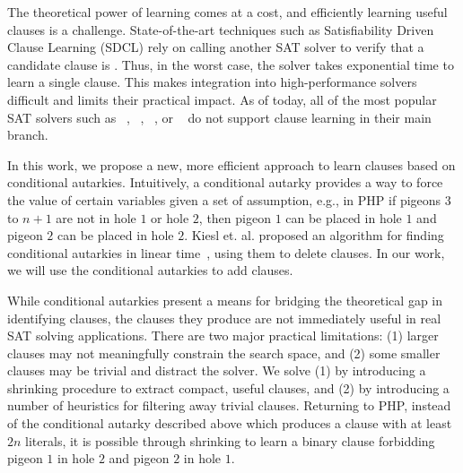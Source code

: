 The theoretical power of \pr learning comes at a cost, and efficiently learning
useful \pr clauses is a challenge. State-of-the-art techniques such as
Satisfiability Driven Clause Learning (SDCL) rely on calling another SAT solver
to verify that a candidate clause is \pr \cite{sadical}. 
Thus, in the worst case, the solver takes exponential time to learn a single \pr
clause. This makes integration into high-performance solvers difficult and
limits their practical impact. As of today, all of the most popular SAT solvers such as
\cadical~\cite{cadical}, \kissat~\cite{kissat},
\cryptoMiniSAT~\cite{cryptominisat}, or \lingeling~\cite{lingeling} do not
support \pr clause learning in their main branch.

In this work, we propose a new, more efficient approach to learn \pr clauses
based on conditional autarkies. Intuitively, a conditional autarky provides a
way to force the value of certain variables given a set of assumption, e.g., in
PHP if pigeons $3 $ to $ n+1$ are not in hole $1$ or hole $2$, then pigeon $1$
can be placed in hole $1$ and pigeon $2$ can be placed in hole $2$. Kiesl et.
al. proposed an algorithm for finding conditional autarkies in linear
time~\cite{conditionalautarkies}, using them to delete clauses. In our work, we
will use the conditional autarkies to add \pr clauses. 
%

While conditional autarkies present a means for bridging the theoretical gap in
identifying \pr clauses, the \pr clauses they produce are not immediately useful
in real SAT solving applications. There are two major practical limitations: (1)
larger \pr clauses may not meaningfully constrain the search space, and (2) some
smaller \pr clauses may be trivial and distract the solver. We solve (1) by
introducing a shrinking procedure to extract compact, useful \pr clauses, and
(2) by introducing a number of heuristics for filtering away trivial \pr clauses.
Returning to PHP, instead of the conditional autarky described above which
produces a clause with at least $2n$ literals, it is possible through shrinking
to learn a binary \pr clause forbidding pigeon $1$ in hole $2$ and pigeon $2$ in
hole $1$.

